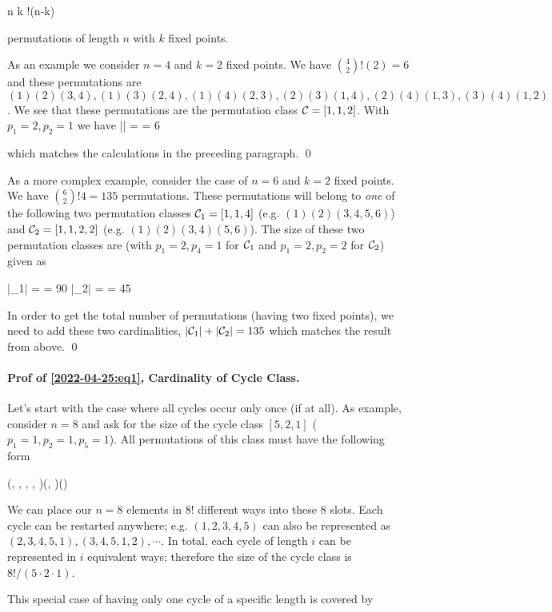 \bee
{n \choose k} !(n-k)
\eee

permutations of length $n$ with $k$ fixed points.

As an example we consider $n=4$ and $k=2$ fixed points. We have ${4 \choose 2} !(2) = 6$ and these permutations are $(1)(2)(3,4), (1)(3)(2,4), (1)(4)(2,3), (2)(3)(1,4), (2)(4)(1,3), (3)(4)(1,2)$. We see that these permutations are the permutation class $\mathcal{C} = [1,1,2]$. With $p_1=2, p_2=1$ we have
\bee
|\Cc| =  = 6
\eee

which matches the calculations in the preceding paragraph. \qed

As a more complex example, consider the case of $n=6$ and $k=2$ fixed points. We have ${6 \choose 2} !4 = 135$ permutations. These permutations will belong to \emph{one} of the following two permutation classes $\mathcal{C}_1 = [1,1,4]$ (e.g. $(1)(2)(3,4,5,6)$) and $\mathcal{C}_2 = [1,1,2,2]$ (e.g. $(1)(2)(3,4)(5,6)$).
The size of these two permutation classes are (with $p_1=2, p_4=1$ for $\mathcal{C}_1$ and $p_1=2, p_2=2$ for $\mathcal{C}_2$) given as

\bee
|\Cc_1| =  = 90 \quad |\Cc_2| =  = 45
\eee

In order to get the total number of permutations (having two fixed points), we need to add these two cardinalities, $|\mathcal{C}_1| + |\mathcal{C}_2| = 135$ which matches the result from above. \qed

\paragraph{Prof of \eqref{2022-04-25:eq1}, Cardinality of Cycle Class.} Let's start with the case where all cycles occur only once (if at all). As example, consider $n=8$ and ask for the size of the cycle class $[5, 2, 1]$ ($p_1=1, p_2=1, p_5=1$). All permutations of this class must have the following form

\bee
(\cdot, \cdot, \cdot, \cdot, \cdot)(\cdot, \cdot)(\cdot)
\eee

We can place our $n=8$ elements in $8!$ different ways into these 8 slots. Each cycle can be restarted anywhere; e.g. $(1,2,3,4,5)$ can also be represented as $(2,3,4,5,1), (3,4,5,1,2), \cdots$. In total, each cycle of length $i$ can be represented in $i$ equivalent ways; therefore the size of the cycle class is $8! / (5 \cdot 2 \cdot 1)$.

This special case of having only one cycle of a specific length is covered by

